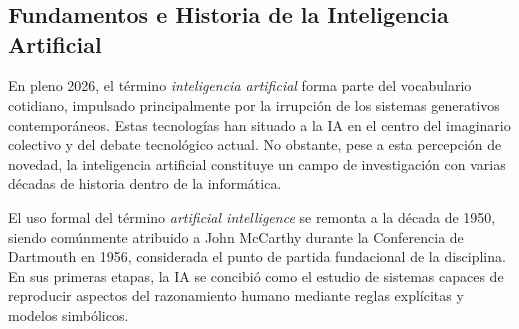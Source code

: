 




\chapter{\stateoftheartname} %

\section{Fundamentos e Historia de la Inteligencia Artificial}

En pleno 2026, el término \textit{inteligencia artificial} forma parte del vocabulario cotidiano, impulsado principalmente por la irrupción de los sistemas generativos contemporáneos. Estas tecnologías han situado a la IA en el centro del imaginario colectivo y del debate tecnológico actual. No obstante, pese a esta percepción de novedad, la inteligencia artificial constituye un campo de investigación con varias décadas de historia dentro de la informática.

El uso formal del término \textit{artificial intelligence} se remonta a la década de 1950, siendo comúnmente atribuido a John McCarthy durante la Conferencia de Dartmouth en 1956, considerada el punto de partida fundacional de la disciplina. \cite{mccarthy2006}
En sus primeras etapas, la IA se concibió como el estudio de sistemas capaces de reproducir aspectos del razonamiento humano mediante reglas explícitas y modelos simbólicos.

